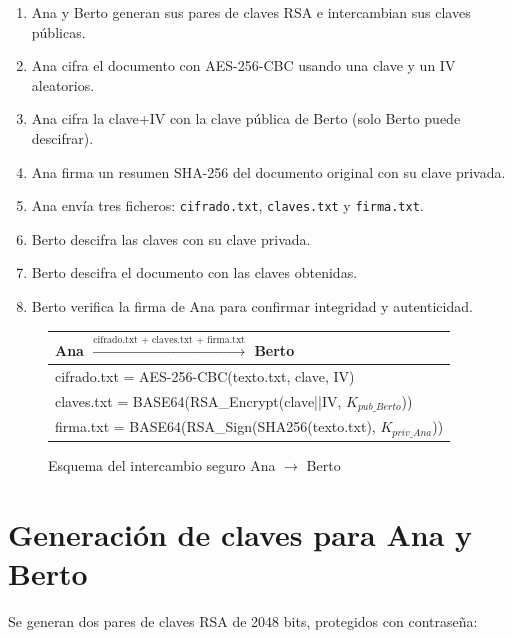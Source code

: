 \begin{enumerate}
    \item Ana y Berto generan sus pares de claves RSA e intercambian sus claves públicas.
    \item Ana cifra el documento con AES-256-CBC usando una clave y un IV aleatorios.
    \item Ana cifra la clave+IV con la clave pública de Berto (solo Berto puede descifrar).
    \item Ana firma un resumen SHA-256 del documento original con su clave privada.
    \item Ana envía tres ficheros: \texttt{cifrado.txt}, \texttt{claves.txt} y \texttt{firma.txt}.
    \item Berto descifra las claves con su clave privada.
    \item Berto descifra el documento con las claves obtenidas.
    \item Berto verifica la firma de Ana para confirmar integridad y autenticidad.
\end{enumerate}

\begin{figure}[H]
    \centering
    \begin{tabularx}{\textwidth}{|X|}
        \hline
        \textbf{Ana} $\xrightarrow{\text{cifrado.txt + claves.txt + firma.txt}}$ \textbf{Berto} \\
        \hline
        \small{cifrado.txt = AES-256-CBC(texto.txt, clave, IV)} \\
        \small{claves.txt = BASE64(RSA\_Encrypt(clave||IV, $K_{pub\_Berto}$))} \\
        \small{firma.txt = BASE64(RSA\_Sign(SHA256(texto.txt), $K_{priv\_Ana}$))} \\
        \hline
    \end{tabularx}
    \caption{Esquema del intercambio seguro Ana $\rightarrow$ Berto}
\end{figure}


\section{Generación de claves para Ana y Berto}

Se generan dos pares de claves RSA de 2048 bits, protegidos con contraseña:

